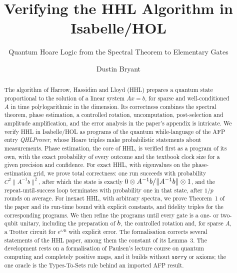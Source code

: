 \documentclass[runningheads]{llncs}
\let\ket\relax\let\bra\relax\let\braket\relax\let\ketbra\relax
\newcommand{\ket}[1]{|#1\rangle}
\newcommand{\bra}[1]{\langle #1|}
\newcommand{\braket}[2]{\langle #1|#2\rangle}
\newcommand{\ketbra}[2]{|#1\rangle\langle #2|}
\newcommand{\norm}[1]{\|#1\|}
\begin{document}
\title{Verifying the HHL Algorithm in Isabelle/HOL}
\subtitle{Quantum Hoare Logic from the Spectral Theorem to Elementary Gates}
\author{Dustin Bryant}
\maketitle
\begin{abstract}
The algorithm of Harrow, Hassidim and Lloyd (HHL) prepares a quantum state proportional to the
solution of a linear system $Ax=b$, for sparse and well-conditioned $A$ in time polylogarithmic in
the dimension. Its correctness combines the spectral theorem, phase estimation, a controlled rotation, uncomputation,
post-selection and amplitude amplification, and the error analysis in the paper's appendix is
intricate. We verify HHL in Isabelle/HOL as programs of the quantum while-language of the AFP entry
\emph{QHLProver}, whose Hoare triples make probabilistic statements about measurements. Phase estimation, the core of
HHL, is verified first as a program of its own, with the exact probability of every outcome and the
textbook clock size for a given precision and confidence. For exact HHL, with eigenvalues on the phase-estimation grid, we prove total correctness:
one run succeeds with
probability $C^2\norm{A^{-1}b}^2$, after which the state is exactly
$\ket0\otimes A^{-1}b/\norm{A^{-1}b}\otimes\ket1$, and the repeat-until-success loop terminates with
probability one in that state, after $1/p$ rounds on average. For inexact HHL, with arbitrary
spectra, we prove Theorem~1 of the paper and its run-time bound with explicit constants, and fidelity triples for the
corresponding programs. We then refine the programs until every gate is a one- or two-qubit unitary,
including the preparation of $\ket b$, the controlled rotation and, for sparse $A$, a Trotter circuit
for $e^{iAt}$ with explicit error. The formalisation corrects several statements of the HHL paper,
among them the constant of its Lemma~3. The development rests on a
formalisation of Paulsen's lecture course on quantum computing and completely positive maps, and it
builds without \texttt{sorry} or axioms; the one oracle is the Types-To-Sets rule behind an imported AFP
result.

\end{abstract}
\end{document}
